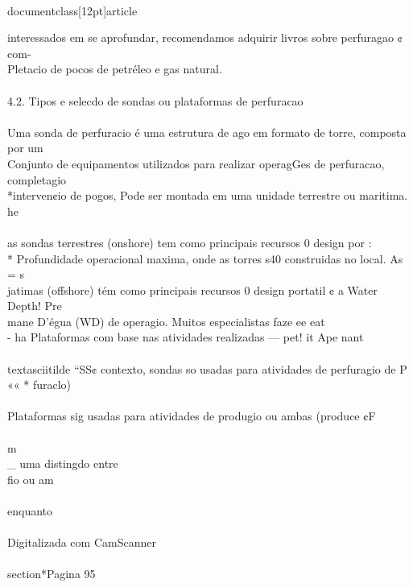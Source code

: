 \\documentclass[12pt]{article}
\begin{document}
interessados em se aprofundar, recomendamos adquirir livros sobre perfuragao ¢ com-\\
Pletacio de pocos de petréleo e gas natural.\\
\\
4.2. Tipos e selecdo de sondas ou plataformas de perfuracao\\
\\
Uma sonda de perfuracio é uma estrutura de ago em formato de torre, composta por um\\
Conjunto de equipamentos utilizados para realizar operagGes de perfuracao, completagio\\
*interven¢io de pogos, Pode ser montada em uma unidade terrestre ou maritima. he\\
\\
as sondas terrestres (onshore) tem como principais recursos 0 design por :\\
* Profundidade operacional maxima, onde as torres s40 construidas no local. As = s\\
jatimas (offshore) tém como principais recursos 0 design portatil ¢ a Water Depth! Pre\\
mane D'égua (WD) de operagio. Muitos especialistas faze ee eat\\
- ha Plataformas com base nas atividades realizadas — pet! it Ape nant\\
\\textasciitilde{} “SS¢ contexto, sondas so usadas para atividades de perfuragio de P «« * furaclo)\\
\\
Plataformas sig usadas para atividades de produgio ou ambas (produce ¢F\\
\\
m\\_ uma distingdo entre\\
fio ou am\\
\\
enquanto\\
\\
Digitalizada com CamScanner\\

\\section*{Pagina 95}
\end{document}

